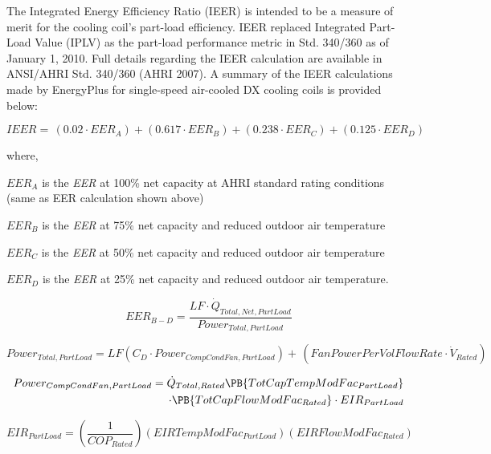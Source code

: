 The Integrated Energy Efficiency Ratio (IEER) is intended to be a measure of merit for the cooling coil's part-load efficiency. IEER replaced Integrated Part-Load Value (IPLV) as the part-load performance metric in Std. 340/360 as of January 1, 2010. Full details regarding the IEER calculation are available in ANSI/AHRI Std. 340/360 (AHRI 2007). A summary of the IEER calculations made by EnergyPlus for single-speed air-cooled DX cooling coils is provided below:

\begin{equation}
IEER = \,(0.02 \cdot EE{R_A}) + (0.617 \cdot EE{R_B}) + (0.238 \cdot EE{R_C}) + (0.125 \cdot EE{R_D})
\end{equation}

where,

\(EE{R_A}\) is the \emph{EER} at 100\% net capacity at AHRI standard rating conditions (same as EER calculation shown above)

\(EE{R_B}\) is the \emph{EER} at 75\% net capacity and reduced outdoor air temperature

\(EE{R_C}\) is the \emph{EER} at 50\% net capacity and reduced outdoor air temperature

\(EE{R_D}\) is the \emph{EER} at 25\% net capacity and reduced outdoor air temperature.

\begin{equation}
EE{R_{B - D}} = \frac{{LF \cdot {{\dot Q}_{Total,Net,PartLoad}}}}{{Powe{r_{Total, PartLoad}}}}
\end{equation}

\begin{equation}
Powe{r_{Total, PartLoad}} = LF\left( {{C_D} \cdot Powe{r_{CompCondFan, PartLoad}}} \right) + \,\left( {FanPowerPerVolFlowRate \cdot {{\dot V}_{Rated}}} \right)
\end{equation}

\begin{equation}
\begin{split}
Power_{CompCondFan,PartLoad} = \dot{Q}_{Total,Rated}\PB{TotCapTempModFac_{PartLoad}} \\
\cdot \PB{TotCapFlowModFac_{Rated}} \cdot EIR_{PartLoad}
\end{split}
\end{equation}

\begin{equation}
EI{R_{PartLoad}} = \left( {\frac{1}{{CO{P_{Rated}}}}} \right)(EIRTempModFa{c_{PartLoad}})(EIRFlowModFa{c_{Rated}})
\end{equation}

